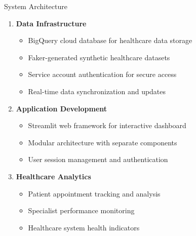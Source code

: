 \documentclass[aspectratio=169]{beamer}
\begin{document}
\begin{frame}{System Architecture}
\begin{enumerate}
    \item \textbf{Data Infrastructure}
    \begin{itemize}
        \item BigQuery cloud database for healthcare data storage
        \item Faker-generated synthetic healthcare datasets
        \item Service account authentication for secure access
        \item Real-time data synchronization and updates
    \end{itemize}
    
    \item \textbf{Application Development}
    \begin{itemize}
        \item Streamlit web framework for interactive dashboard
        \item Modular architecture with separate components
        \item User session management and authentication
    \end{itemize}
    
    \item \textbf{Healthcare Analytics}
    \begin{itemize}
        \item Patient appointment tracking and analysis
        \item Specialist performance monitoring
        \item Healthcare system health indicators
    \end{itemize}
\end{enumerate}
\end{frame}
\end{document}
